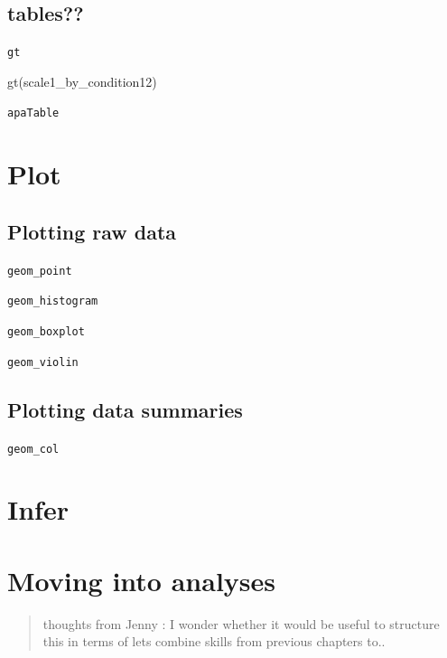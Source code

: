 \documentclass[
  letterpaper,
  DIV=11,
  numbers=noendperiod]{scrreprt}
\newenvironment{Shaded}{\begin{snugshade}}{\end{snugshade}}
\newcommand{\FunctionTok}[1]{\textcolor[rgb]{0.28,0.35,0.67}{#1}}
\newcommand{\NormalTok}[1]{\textcolor[rgb]{0.00,0.23,0.31}{#1}}
\begin{document}
\section{tables??}\label{tables}

\texttt{gt}

\begin{Shaded}
\begin{Highlighting}[]
\FunctionTok{gt}\NormalTok{(scale1\_by\_condition12)}
\end{Highlighting}
\end{Shaded}

\texttt{apaTable}


\chapter{Plot}\label{plot}

\section{Plotting raw data}\label{plotting-raw-data}

\texttt{geom\_point}

\texttt{geom\_histogram}

\texttt{geom\_boxplot}

\texttt{geom\_violin}

\section{Plotting data summaries}\label{plotting-data-summaries}

\texttt{geom\_col}


\chapter{Infer}\label{infer}


\chapter{Moving into analyses}\label{moving-into-analyses}

\begin{quote}
thoughts from Jenny : I wonder whether it would be useful to structure
this in terms of lets combine skills from previous chapters to..
\end{quote}
\end{document}
